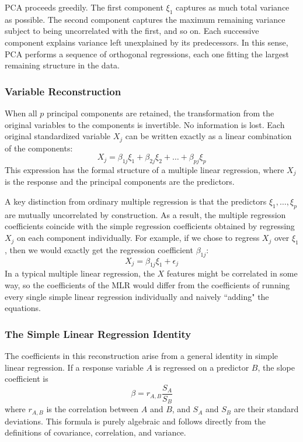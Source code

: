PCA proceeds greedily. The first component $\xi_1$ captures as much total variance as possible. The second component captures the maximum remaining variance subject to being uncorrelated with the first, and so on. Each successive component explains variance left unexplained by its predecessors. In this sense, PCA performs a sequence of orthogonal regressions, each one fitting the largest remaining structure in the data.

\medskip

\subsubsection{Variable Reconstruction}

When all $p$ principal components are retained, the transformation from the original variables to the components is invertible. No information is lost. Each original standardized variable $X_j$ can be written exactly as a linear combination of the components:
\[
X_j = \beta_{1j}\xi_1 + \beta_{2j}\xi_2 + \dots + \beta_{pj}\xi_p
\]
This expression has the formal structure of a multiple linear regression, where $X_j$ is the response and the principal components are the predictors.

A key distinction from ordinary multiple regression is that the predictors $\xi_1, \dots, \xi_p$ are mutually uncorrelated by construction. As a result, the multiple regression coefficients coincide with the simple regression coefficients obtained by regressing $X_j$ on each component individually. For example, if we chose to regress $X_j$ over $\xi_1$, then we would exactly get the regression coefficient $\beta_{1j}$:
\[
X_j = \beta_{1j}\xi_1 + \epsilon_j
\]
In a typical multiple linear regression, the $X$ features might be correlated in some way, so the coefficients of the MLR would differ from the coefficients of running every single simple linear regression individually and naively ``adding" the equations. 

\medskip

\subsubsection{The Simple Linear Regression Identity}

The coefficients in this reconstruction arise from a general identity in simple linear regression. If a response variable $A$ is regressed on a predictor $B$, the slope coefficient is
\[
\beta = r_{A,B} \frac{S_A}{S_B}
\]
where $r_{A,B}$ is the correlation between $A$ and $B$, and $S_A$ and $S_B$ are their standard deviations. This formula is purely algebraic and follows directly from the definitions of covariance, correlation, and variance.

